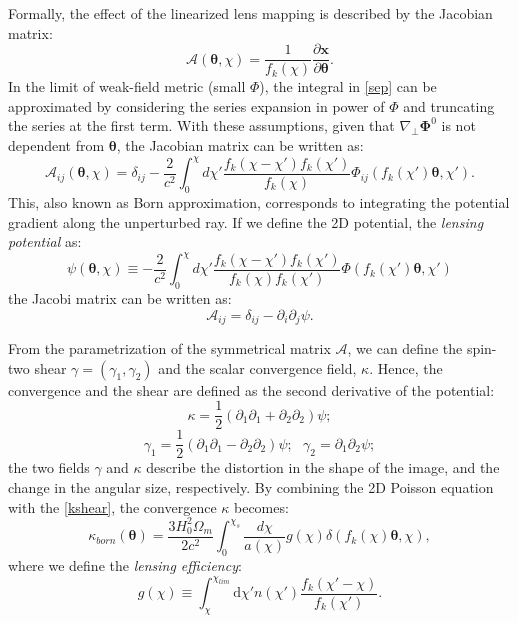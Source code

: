 \documentclass[twocolumn,twocolappendix]{aastex63}
\begin{document}
Formally, the effect of the linearized lens mapping is described by the Jacobian matrix:
\begin{equation}
\mathcal{A}(\boldsymbol{\theta},\chi)=
\frac{1}{f_{k}(\chi)}
\frac{\partial \textbf{x}}{\partial \boldsymbol{\theta}}.
\end{equation}
In the limit of weak-field metric (small $\Phi$), the integral in \autoref{sep} can be approximated by considering the series expansion in power of $\Phi$ and truncating the series at the first term.
With these assumptions, given that $\nabla_{\bot}\boldsymbol{\Phi}^0$ is not dependent from $\boldsymbol{\theta}$, the Jacobian matrix can be written as:
\begin{equation}
    \mathcal{A}_{ij}(\boldsymbol{\theta},\chi)
     =\delta_{ij}-\frac{2}{c^2}
    \int_0^{\chi} d\chi'
     \frac{f_k(\chi-\chi')f_k(\chi')}{f_k(\chi)}
     \Phi_{ij}(f_k(\chi')\boldsymbol{\theta},\chi').
\end{equation}
This, also known as Born approximation, corresponds to integrating the potential gradient along the unperturbed ray.
If we define the 2D potential, the \textit{lensing potential} as:
\begin{equation}
    \psi(\boldsymbol{\theta},\chi) \equiv
 -\frac{2}{c^2}
 \int_0^{\chi} d\chi'
   \frac{f_k(\chi-\chi')f_k(\chi')}{f_k(\chi)f_k(\chi')}
  \Phi(f_k(\chi')\boldsymbol{\theta},\chi')
\end{equation}
 the Jacobi matrix can be written as:
\begin{equation}
    \mathcal{A}_{ij}=\delta_{ij}-\partial_i \partial_j\psi.
\end{equation}

From the parametrization of the symmetrical matrix $\mathcal{A}$, we can define the spin-two shear $\gamma=(\gamma_1,\gamma_2)$ and the scalar convergence field, $\kappa$. 
Hence, the convergence and the shear are defined as the second derivative of the potential:
\begin{equation}\label{kshear}
    \kappa=\frac{1}{2}(\partial_1\partial_1+\partial_2\partial_2)\psi;  
\end{equation}
\begin{equation}
 \gamma_1=\frac{1}{2}(\partial_1\partial_1-\partial_2\partial_2)\psi; \  \  \
 \gamma_2=\partial_1\partial_2\psi;   
\end{equation}
the two fields $\gamma$ and $\kappa$ describe the distortion in the shape of the image, and the change in the angular size, respectively.
By combining the 2D Poisson equation with the \autoref{kshear}, the convergence $\kappa$ becomes:
\begin{equation}\label{born_approx}
    \kappa_{born}(\boldsymbol{\theta})= \frac{3H_0^2 \Omega_m}{2c^2}
    \int_0^{\chi_s} 
    \frac{d\chi}{a(\chi)}
    g(\chi)
    \delta(f_k(\chi)\boldsymbol{\theta},\chi),
\end{equation}
where we define the \textit{lensing efficiency}:
\begin{equation}
   g(\chi) \equiv
  \int_{\chi}^{\chi_{lim}} \text{d}\chi'
   n(\chi')
    \frac{f_k(\chi'-\chi)}{f_k(\chi')}.
\end{equation}
\end{document}
